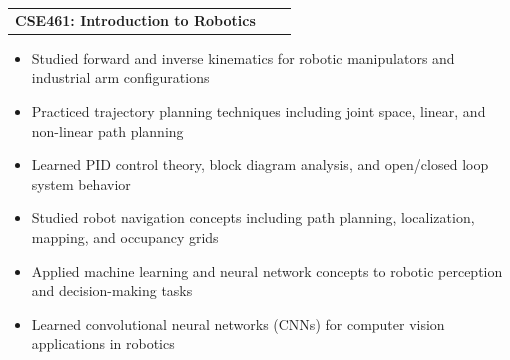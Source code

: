 \documentclass[a4paper,12pt]{article}
\makeatletter
\newenvironment{joblong}[2]
    {
    \begin{tabularx}{\linewidth}{@{}l X r@{}}
    \textbf{#1} & \hfill &  #2 \\[3.75pt]
    \end{tabularx}
    \begin{minipage}[t]{\linewidth}
    \begin{itemize}[nosep,after=\strut, leftmargin=1em, itemsep=3pt,label=--]
    }
    {
    \end{itemize}
    \end{minipage}    
    }
\makeatother
\begin{document}

\begin{joblong}{CSE461: Introduction to Robotics}{}
    \item Studied forward and inverse kinematics for robotic manipulators and industrial arm configurations
    \item Practiced trajectory planning techniques including joint space, linear, and non-linear path planning
    \item Learned PID control theory, block diagram analysis, and open/closed loop system behavior
    \item Studied robot navigation concepts including path planning, localization, mapping, and occupancy grids
    \item Applied machine learning and neural network concepts to robotic perception and decision-making tasks
    \item Learned convolutional neural networks (CNNs) for computer vision applications in robotics
\end{joblong}

\end{document}
